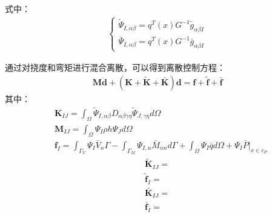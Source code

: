 \documentclass[a4paper]{article}
\begin{document}
式中：
\begin{equation}
\begin{split}
\begin{cases}
    \tilde{\Psi}_{I,\alpha\beta}=q^T(x)G^{-1}\tilde{g}_{\alpha\beta I}\\
    \bar{\Psi}_{I,\alpha\beta}=q^T(x)G^{-1}\bar{g}_{\alpha\beta I}
\end{cases}
\end{split}
\end{equation}\par
通过对挠度和弯矩进行混合离散，可以得到离散控制方程：
\begin{equation}
\begin{split}
    \pmb{M}\ddot{\pmb d}+(\pmb{K}+\pmb{\tilde{K}}+\pmb{\bar{K}})\pmb{d}=\pmb{f}+\pmb{\tilde{f}}+\pmb{\bar f}
\end{split}
\end{equation}
其中：
\begin{equation}
\begin{split}
    &\pmb{K}_{I\!J}=\int_{\Omega}\tilde{\Psi}_{I,\alpha\beta}D_{\alpha\beta\gamma\eta}\tilde{\Psi}_{J,\gamma\eta}d\Omega\\
    &\pmb{M}_{I\!J}=\int_{\Omega}\Psi_I\rho h\Psi_Jd\Omega\\
    &\pmb{f}_I=\int_{\Gamma_V}\Psi_I\bar{V}_n\Gamma-\int_{\Gamma_M}\Psi_{I,n}\bar{M}_{nn}d\Gamma+\int_{\Omega}\Psi_I\bar{q}d\Omega+\Psi_I\bar{P}\vert_{x\in c_P}
\end{split}
\end{equation}
\begin{equation}
\begin{split}
   \pmb{\tilde{K}}_{I\!J}=\\
   \pmb{\tilde{f}}_I= 
\end{split}
\end{equation}
\begin{equation}
\begin{split}
     \pmb{\bar{K}}_{I\!J}=\\
     \pmb{\bar{f}}_I=
\end{split}
\end{equation}
\end{document}
